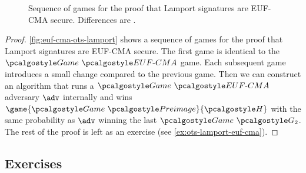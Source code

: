 \begin{figure}[tbh]
\begin{tcolorbox}
\begin{pchstack}[center]
\begin{pcvstack}
    \pcvspace
   \end{pcvstack}
  \end{pchstack}
 \end{tcolorbox}
 \caption{Sequence of games for the proof that Lamport signatures are EUF-CMA secure. Differences are .}
 \label{fig:euf-cma-ots-lamport}
\end{figure}


\begin{proof}
    \autoref{fig:euf-cma-ots-lamport} shows a sequence of games for the proof that Lamport signatures are EUF-CMA secure.
    The first game is identical to the $\Game~\algo{EUF\text{-}CMA}$ game.
    Each subsequent game introduces a small change compared to the previous game.
    Then we can construct an algorithm that runs a $\Game~\algo{EUF\text{-}CMA}$ adversary $\adv$ internally and wins $\game{\Game~\algo{Preimage}}{\algo{H}}$ with the same probability as $\adv$ winning the last  $\Game~\algo{G_2}$.
    The rest of the proof is left as an exercise (see \autoref{ex:ots-lamport-euf-cma}).
\end{proof}

\subsection{Exercises}


